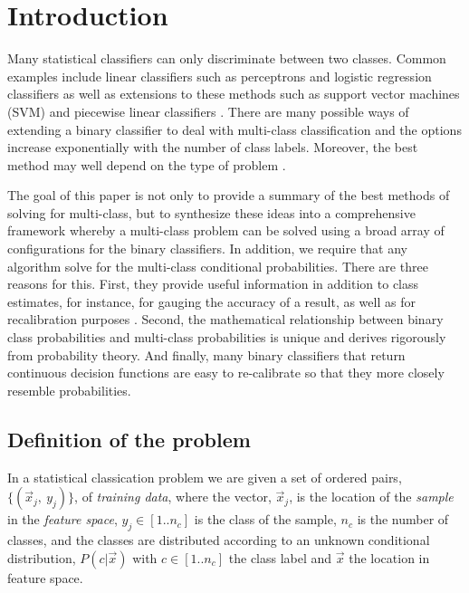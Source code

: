 \section{Introduction}

Many statistical classifiers can only discriminate between two classes.
Common examples include linear classifiers such as perceptrons and
logistic regression classifiers \citep{Michie_etal1994} as well as extensions
to these methods such as support vector machines (SVM) \citep{Mueller_etal2001} and 
piecewise linear classifiers \citep{Bagirov2005,Mills2018}.
There are many possible ways of extending a binary classifier to deal
with multi-class classification and the options increase exponentially
with the number of class labels.
Moreover, the best method may well depend on the type of problem
\citep{Dietterich_Bakiri1995,Allwein_etal2000}.

The goal of this paper is not only to provide a summary of the
best methods of solving for multi-class, but to synthesize
these ideas into a comprehensive framework whereby a multi-class problem
can be solved using a broad array of configurations for the binary
classifiers. 
In addition, we require that any algorithm solve 
for the multi-class conditional probabilities.
There are three reasons for this.
First, they provide useful information
in addition to class estimates,
for instance, for gauging the accuracy of a result, as well as for recalibration
purposes \citep{Mills2009}.
Second, the mathematical relationship between binary class
probabilities and multi-class probabilities is unique and
derives rigorously from probability theory.
And finally, many binary classifiers that return continuous decision functions
are easy to re-calibrate so that they more closely resemble probabilities.

\subsection{Definition of the problem}

\label{description}

In a statistical classication problem we are given a set of ordered pairs, 
$\lbrace (\vec x_j,~ y_j) \rbrace$, of {\it training data},
where the vector, $\vec x_j$, is the location of the {\it sample} in 
the {\it feature space},
$y_j \in [1..n_c]$ is the class of the sample,
$n_c$ is the number of classes,
and the classes are
distributed according to an unknown conditional distribution,
$P(c | \vec x)$ with $c \in [1..n_c]$ the class label and $\vec x$ the location
in feature space.

